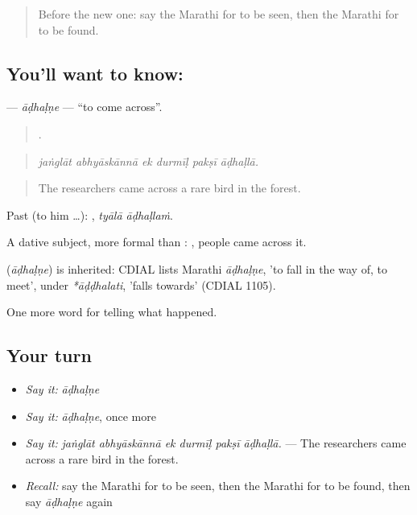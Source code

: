 \label{lesson:MR-C301-adhalne}



\begin{quote}
Before the new one: say the Marathi for to be seen, then the Marathi for to be found.
\end{quote}

\subsection*{You'll want to know: }
\textbf{} — \emph{āḍhaḷṇe} — \textquotedblleft{}to come across\textquotedblright{}.

\begin{quote}
     .
\end{quote}

\begin{quote}
\emph{jaṅglāt abhyāskānnā ek durmīḷ pakṣī āḍhaḷlā.}
\end{quote}

\begin{quote}
The researchers came across a rare bird in the forest.
\end{quote}

Past (to him …):  , \emph{tyālā āḍhaḷlaṁ}.

A dative subject, more formal than :  , people came across it.

\begin{cousinweb}
\textbf{} (\emph{āḍhaḷṇe}) is inherited: CDIAL lists Marathi \emph{āḍhaḷṇe}, 'to fall in the way of, to meet', under \emph{*āḍḍhalati}, 'falls towards' (CDIAL 1105).
\end{cousinweb}

\begin{grammarlens}[title={What you've built}]
One more word for telling what happened.
\end{grammarlens}

\subsection*{Your turn}
\begin{itemize}
\raggedright
  \item \emph{Say it:} \emph{āḍhaḷṇe}
  \item \emph{Say it:} \emph{āḍhaḷṇe}, once more
  \item \emph{Say it:} \emph{jaṅglāt abhyāskānnā ek durmīḷ pakṣī āḍhaḷlā.} — The researchers came across a rare bird in the forest.
  \item \emph{Recall:} say the Marathi for to be seen, then the Marathi for to be found, then say \emph{āḍhaḷṇe} again
\end{itemize}

